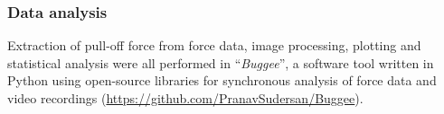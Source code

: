 \documentclass[vruler,JEB]{COB}%
\providecommand{\DIFdel}[1]{{\protect\color{red}\sout{#1}}}                      %
\providecommand{\DIFdelbegin}{} %
\providecommand{\DIFdelend}{} %
\providecommand{\DIFdelFL}[1]{\DIFdel{#1}} %
\begin{document}
%

\subsubsection{Data analysis}

Extraction of pull-off force from force data, image processing, plotting
and statistical analysis were all performed in ``\emph{Buggee}'',
a software tool written in Python using open-source libraries for synchronous
analysis of force data and video recordings (\url{https://github.com/PranavSudersan/Buggee}). 
\end{document}
